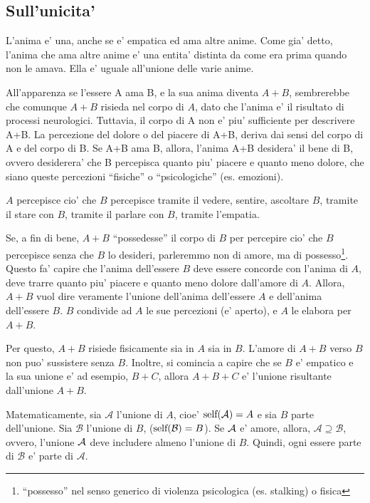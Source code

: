 \subsection{Sull'unicita'}

L'anima e' una, anche se e' empatica ed ama altre anime. Come gia' detto, l'anima che ama altre anime e' una entita' distinta da come era prima quando non le amava. Ella e' uguale all'unione delle varie anime. 

All'apparenza se l'essere A ama B, e la sua anima diventa $A+B$, sembrerebbe che comunque $A+B$ risieda nel corpo di $A$, dato che l'anima e' il risultato di processi neurologici. Tuttavia, il corpo di A non e' piu' sufficiente per descrivere A+B. La percezione del dolore o del piacere di A+B, deriva dai sensi del corpo di A e del corpo di B. Se A+B ama B, allora, l'anima A+B desidera' il bene di B, ovvero desiderera' che B percepisca quanto piu' piacere e quanto meno dolore, che siano queste percezioni ``fisiche'' o ``psicologiche'' (es. emozioni). 

$A$ percepisce cio' che  $B$ percepisce tramite il vedere, sentire, ascoltare $B$, tramite il stare con $B$, tramite il parlare con $B$, tramite l'empatia.

Se, a fin di bene, $A+B$ ``possedesse'' il corpo di $B$ per percepire cio' che $B$ percepisce senza che $B$ lo desideri, parleremmo non di amore, ma di possesso\footnote{``possesso'' nel senso generico di violenza psicologica (es. stalking) o fisica}. Questo fa' capire che l'anima dell'essere $B$ deve essere concorde con l'anima di $A$, deve trarre quanto piu' piacere e quanto meno dolore dall'amore di $A$. Allora, $A+B$ vuol dire veramente l'unione dell'anima dell'essere $A$ e dell'anima dell'essere $B$. $B$ condivide ad $A$ le sue percezioni (e' aperto), e $A$ le elabora per $A+B$. 

Per questo, $A+B$ risiede fisicamente sia in $A$ sia in $B$. L'amore di $A+B$ verso $B$ non puo' sussistere senza $B$. Inoltre, si comincia a capire che se $B$ e' empatico e la sua unione e' ad esempio, $B+C$, allora $A+B+C$ e' l'unione risultante dall'unione $A+B$.

Matematicamente, sia $\mathcal{A}$ l'unione di $A$, cioe' $\textrm{self}(\mathcal{A})=A$ e sia $B$ parte dell'unione. Sia $\mathcal{B}$ l'unione di $B$, ($\textrm{self}(\mathcal{B})=B$). Se $\mathcal{A}$ e' amore, allora, $\mathcal{A} \supseteq \mathcal{B}$, ovvero, l'unione $\mathcal{A}$ deve includere almeno l'unione di $B$. Quindi, ogni essere parte di $\mathcal{B}$ e' parte di $\mathcal{A}$.

